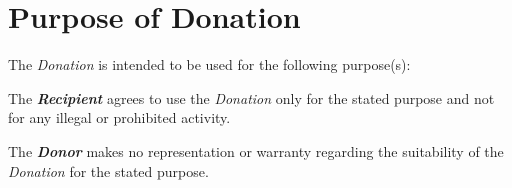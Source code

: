 
\section{Purpose of Donation}
\label{sec:purpose}

The \textit{Donation} is intended to be used for the following purpose(s):

\vspace{0.3cm}

\noindent \donationPurpose{}

\vspace{0.3cm}

\noindent The \textbf{\textit{Recipient}} agrees to use the \textit{Donation} only for the stated purpose and not for any illegal or prohibited activity. 

\vspace{0.3cm}

\noindent The \textbf{\textit{Donor}} makes no representation or warranty regarding the suitability of the \textit{Donation} for the stated purpose.

